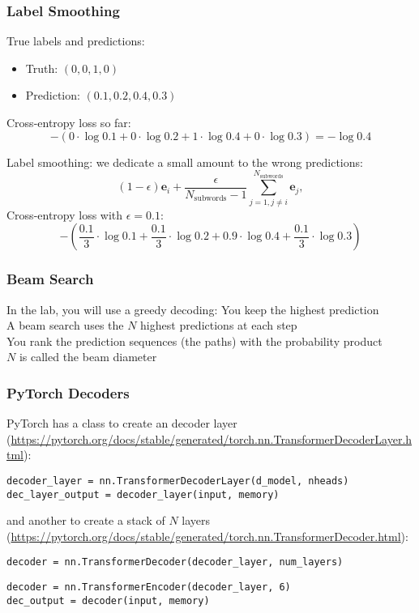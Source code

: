 \begin{frame}[fragile]
\frametitle{Label Smoothing}\color{structure}
True labels and predictions:
\begin{itemize}\color{structure}
\item Truth: $(0, 0, 1, 0)$
\item Prediction: $(0.1, 0.2, 0.4, 0.3)$
\end{itemize}
Cross-entropy loss so far:
\[
-(0 \cdot \log 0.1 + 0 \cdot \log0.2 + 1 \cdot \log 0.4 + 0 \cdot \log 0.3) = - \log 0.4
\]

Label smoothing: we dedicate a small amount to the wrong predictions:
\[
(1 - \epsilon) \mathbf{e}_i + \frac{\epsilon}{N_\text{subwords} -1}\sum_{j= 1, j \neq i}^{N_\text{subwords}}  \mathbf{e}_j,
\]
Cross-entropy loss with $\epsilon = 0.1$:
\[
-(\frac{0.1}{3} \cdot \log 0.1 + \frac{0.1}{3}  \cdot \log0.2 + 0.9 \cdot \log 0.4 + \frac{0.1}{3}  \cdot \log 0.3) 
\]
\end{frame}

\begin{frame}[fragile]
\frametitle{Beam Search}\color{structure}
In the lab, you will use a greedy decoding: You keep the highest prediction\\
A beam search uses the $N$ highest predictions at each step\\
You rank the prediction sequences (the paths) with the probability product\\
$N$ is called the beam diameter
\end{frame}

\begin{frame}[fragile]
\frametitle{PyTorch Decoders}\color{structure}
PyTorch has a class to create an decoder layer (\url{https://pytorch.org/docs/stable/generated/torch.nn.TransformerDecoderLayer.html}):
\begin{verbatim}
decoder_layer = nn.TransformerDecoderLayer(d_model, nheads)
dec_layer_output = decoder_layer(input, memory)
\end{verbatim}
and another to create a stack of $N$ layers (\url{https://pytorch.org/docs/stable/generated/torch.nn.TransformerDecoder.html}):
\begin{verbatim}
decoder = nn.TransformerDecoder(decoder_layer, num_layers) 
\end{verbatim}

\begin{verbatim}
decoder = nn.TransformerEncoder(decoder_layer, 6)
dec_output = decoder(input, memory)
\end{verbatim}
\end{frame}


